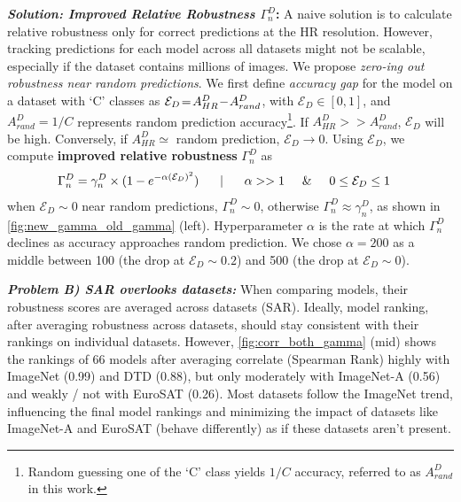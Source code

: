 \textbf{\textit{Solution: Improved Relative Robustness $\Gamma^{D}_{n}$}:} 
A naive solution is to calculate relative robustness only for correct predictions at the HR resolution. 
However, tracking predictions for each model across all datasets might not be scalable, especially if the dataset contains millions of images. We propose \textit{zero-ing out robustness near random predictions}. We first define \textit{accuracy gap} for the model on a dataset with `C’ classes as \underline{$\boldmath{\mathcal{E}_D\!=\!A^{D}_{HR}\!-\!A^{D}_{rand}}$}, with $\mathcal{E}_D\!\in\![0,1]$, and 
$A^{D}_{rand}\!=\!1/C$ represents random prediction accuracy\footnote{Random guessing one of the `C' class yields $1/C$ accuracy, referred to as $A^{D}_{rand}$ in this work.}.
If $A^{D}_{HR}\!>>\!A^{D}_{rand}$, $\mathcal{E}_D$ will be high. Conversely, if $A^{D}_{HR} \simeq$ random prediction, $\mathcal{E}_D\!\rightarrow\!0$.
Using $\mathcal{E}_D$, we compute \textbf{improved relative robustness} $\Gamma^{D}_{n}$ as 
\vspace{-2pt}
\begin{align}
    \Gamma^{D}_{n} &= \gamma^{D}_{n} \times (1 -  e^{- \alpha (\mathcal{E}_D)^2}) \hspace{0.5cm} \mid \hspace{0.5cm} \alpha >> 1 \hspace{0.5cm} \& \hspace{0.5cm} 0 \le \mathcal{E}_D \le 1 \label{eq:improved_robsutness}
\end{align}
when $\mathcal{E}_D\!\sim\!0$ \ie near random predictions, $\Gamma^{D}_{n}\!\sim\!0$, otherwise $\Gamma^{D}_{n} \approx \gamma^{D}_{n}$, as shown in \cref{fig:new_gamma_old_gamma} (left). 
Hyperparameter
$\alpha$  
is the rate at which 
$\Gamma^{D}_{n}$  declines as accuracy approaches random prediction.
We chose $\alpha=200$ as a middle between 100 (the drop at $\mathcal{E}_D\sim0.2$) and 500 (the drop at $\mathcal{E}_D\sim 0$). 



\textbf{\textit{Problem B) SAR overlooks datasets:}} 
When comparing models, their robustness scores are averaged across datasets (SAR). 
Ideally, model ranking, after averaging robustness across datasets, 
should stay consistent with
their rankings on individual datasets.
However, \cref{fig:corr_both_gamma} (mid) shows the rankings of 66 models after averaging correlate (Spearman Rank) highly with ImageNet (0.99) and DTD (0.88), but only moderately with ImageNet-A (0.56) and weakly / not with EuroSAT (0.26). 
Most datasets follow the ImageNet trend, influencing the final model rankings and minimizing the impact of datasets like ImageNet-A and EuroSAT (behave differently) as if these datasets aren't present.


